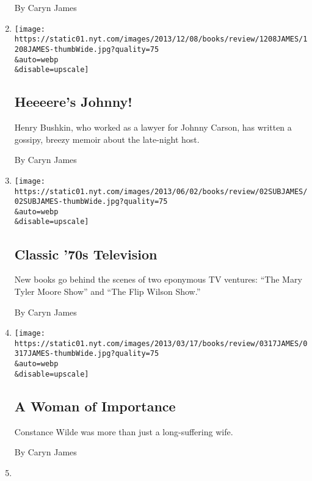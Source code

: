 \begin{enumerate}
  By Caryn James
\item
  \href{/2013/12/08/books/review/johnny-carson-by-henry-bushkin.html}{}

  \texttt{[image: https://static01.nyt.com/images/2013/12/08/books/review/1208JAMES/1208JAMES-thumbWide.jpg?quality=75\\\&auto=webp\\\&disable=upscale]}

  \hypertarget{heeeeres-johnny}{%
  \subsection{Heeeere's Johnny!}\label{heeeeres-johnny}}

  Henry Bushkin, who worked as a lawyer for Johnny Carson, has written a
  gossipy, breezy memoir about the late-night host.

  By Caryn James
\item
  \href{/2013/06/02/books/review/mary-and-lou-and-rhoda-and-ted-and-flip.html}{}

  \texttt{[image: https://static01.nyt.com/images/2013/06/02/books/review/02SUBJAMES/02SUBJAMES-thumbWide.jpg?quality=75\\\&auto=webp\\\&disable=upscale]}

  \hypertarget{classic-70s-television}{%
  \subsection{Classic '70s Television}\label{classic-70s-television}}

  New books go behind the scenes of two eponymous TV ventures: ``The
  Mary Tyler Moore Show'' and ``The Flip Wilson Show.''

  By Caryn James
\item
  \href{/2013/03/17/books/review/constance-by-franny-moyle.html}{}

  \texttt{[image: https://static01.nyt.com/images/2013/03/17/books/review/0317JAMES/0317JAMES-thumbWide.jpg?quality=75\\\&auto=webp\\\&disable=upscale]}

  \hypertarget{a-woman-of-importance}{%
  \subsection{A Woman of Importance}\label{a-woman-of-importance}}

  Constance Wilde was more than just a long-suffering wife.

  By Caryn James
\item
  \href{/2013/02/24/books/review/gods-like-us-by-ty-burr.html}{}


\end{enumerate}
